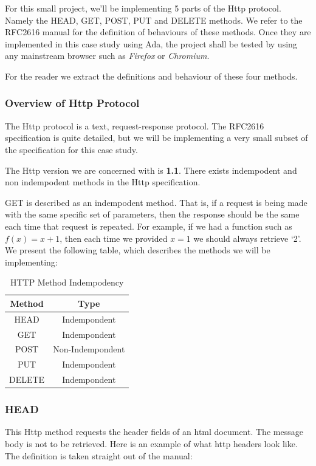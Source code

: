 For this small project, we'll be implementing 5 parts of the Http protocol.
Namely the HEAD, GET, POST, PUT and DELETE methods. We refer to the RFC2616
manual \cite{RFC2616} for the definition of behaviours of these methods. Once
they are implemented in this case study using Ada, the project shall be tested
by using any mainstream browser such as \textit{Firefox} or \textit{Chromium}.

For the reader we extract the definitions and behaviour of these four methods.

\subsubsection{Overview of Http Protocol}
The Http protocol is a text, request-response protocol. The RFC2616
specification is quite detailed, but we will be implementing a very small
subset of the specification for this case study.

The Http version we are concerned with is \textbf{1.1}. There exists
indempodent and non indempodent methods in the Http specification. 

GET is described as an indempodent method. That is, if a request is being made
with the same specific set of parameters, then the response should be the same
each time that request is repeated. For example, if we had a function such as $
f(x) = x + 1 $, then each time we provided $ x = 1 $ we should always retrieve
`2'. We present the following table, which describes the methods we will be
implementing:
\\
\begin{table} 
\begin{center}
\begin{tabular}{| c | c |}
\hline
\textbf{Method} & \textbf{Type} \\ \hline \hline
HEAD   & Indempondent \\
GET    & Indempondent \\
POST   & Non-Indempondent \\
PUT    & Indempondent \\ 
DELETE & Indempondent \\
\hline
\end{tabular}
\end{center}
\caption{HTTP Method Indempodency}
\end{table}
\subsubsection{HEAD}
This Http method requests the header fields of an html document. The message
body is not to be retrieved. Here is an example of what http headers look like.
The definition is taken straight out of the manual:  


